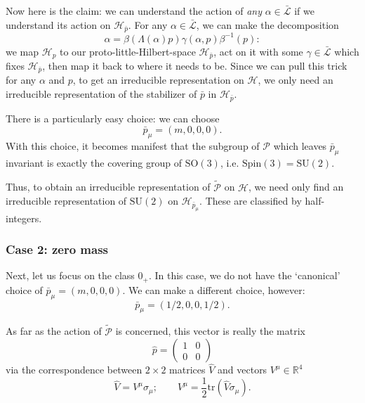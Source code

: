 \documentclass[a4paper,10pt]{scrreprt}
\newcommand{\R}{\mathbb{R}}
\newcommand{\SO}{\mathrm{SO}}
\newcommand{\SU}{\mathrm{SU}}
\theoremstyle{definition}
\theoremstyle{plain}
\theoremstyle{remark}
\begin{document}
Now here is the claim: we can understand the action of \emph{any} $\alpha \in \bar{\mathcal{L}}$ if we understand its action on $\mathscr{H}_{\bar{p}}$. For any $\alpha \in \bar{\mathcal{L}}$, we can make the decomposition 
\begin{equation*}
  \alpha = \beta(\Lambda(\alpha)p) \gamma(\alpha, p) \beta^{-1}(p):
\end{equation*}
we map $\mathscr{H}_{p}$ to our proto-little-Hilbert-space $\mathscr{H}_{\bar{p}}$, act on it with some $\gamma \in \bar{\mathcal{L}}$ which fixes $\mathscr{H}_{\bar{p}}$, then map it back to where it needs to be. Since we can pull this trick for any $\alpha$ and $p$, to get an irreducible representation on $\mathscr{H}$, we only need an irreducible representation of the stabilizer of $\bar{p}$ in $\mathscr{H}_{\bar{p}}$. 

There is a particularly easy choice: we can choose 
\begin{equation*}
  \bar{p}_{\mu} = (m,0,0,0).
\end{equation*}
With this choice, it becomes manifest that the subgroup of $\mathcal{P}$ which leaves $\bar{p}_{\mu}$ invariant is exactly the covering group of $\SO(3)$, i.e. $\mathrm{Spin}(3) = \SU(2)$.

Thus, to obtain an irreducible representation of $\widetilde{\mathcal{P}}$ on $\mathscr{H}$, we need only find an irreducible representation of $\SU(2)$ on $\mathscr{H}_{\bar{p}_{\mu}}$. These are classified by half-integers.

\subsubsection{Case 2: zero mass}
Next, let us focus on the class $0_{+}$. In this case, we do not have the `canonical' choice of $\bar{p}_{\mu} = (m,0,0,0)$. We can make a different choice, however:
\begin{equation*}
  \bar{p}_{\mu} = (1/2,0,0,1/2).
\end{equation*}

As far as the action of $\widetilde{\mathcal{P}}$ is concerned, this vector is really the matrix
\begin{equation*}
  \hat{p} = 
  \begin{pmatrix}
    1 & 0 \\
    0 & 0
  \end{pmatrix}
\end{equation*}
via the correspondence between $2 \times 2$ matrices $\hat{V}$ and vectors $V^{\mu} \in \R^{4}$
\begin{equation*}
  \hat{V} = V^{\mu}\sigma_{\mu};\qquad V^{\mu} = \frac{1}{2} \mathrm{tr}(\hat{V} \sigma_{\mu}).
\end{equation*}
\end{document}
